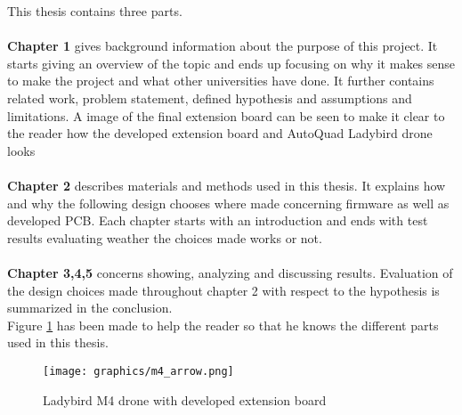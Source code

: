 This thesis contains three parts.\\ \\
\textbf{Chapter 1} gives background information about the purpose of this project. It starts giving an overview of the topic and ends up focusing on why it makes sense to make the project and what other universities have done. It further contains related work,  problem statement, defined hypothesis and assumptions and limitations. A image of the final extension board can be seen to make it clear to the reader how the developed extension board and AutoQuad Ladybird drone looks\\ \\
\textbf{Chapter 2} describes materials and methods used in this thesis. It explains how and why the following design chooses where made concerning firmware as well as developed PCB. Each chapter starts with an introduction and ends with test results evaluating weather the choices made works or not.\\ \\
\textbf{Chapter 3,4,5} concerns showing, analyzing and discussing results. Evaluation of the design choices made throughout chapter 2 with respect to the hypothesis is summarized in the conclusion. \\


Figure \ref{fig:drone_with_arrows} has been made to help the reader so that he knows the different parts used in this thesis.
\begin{figure}[H]
    \center
    \texttt{[image: graphics/m4\_arrow.png]}
  \caption{Ladybird M4 drone with developed extension board}
  \label{fig:drone_with_arrows}
\end{figure}